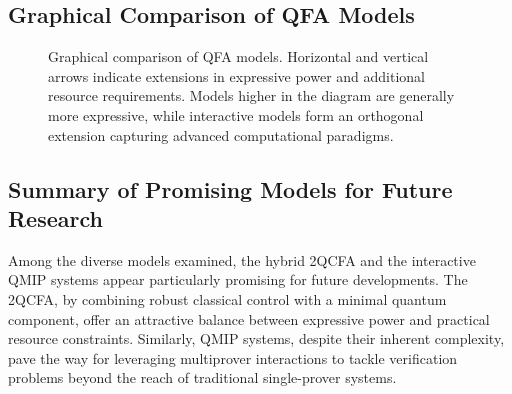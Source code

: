 \subsection*{Graphical Comparison of QFA Models}
\begin{figure}[ht]
\centering
{}
\caption{Graphical comparison of QFA models. Horizontal and vertical arrows indicate extensions in expressive power and additional resource requirements. Models higher in the diagram are generally more expressive, while interactive models form an orthogonal extension capturing advanced computational paradigms.}
\label{fig:qfa-graphical}
\end{figure}

\subsection*{Summary of Promising Models for Future Research}
Among the diverse models examined, the hybrid 2QCFA and the interactive QMIP systems appear particularly promising for future developments. The 2QCFA, by combining robust classical control with a minimal quantum component, offer an attractive balance between expressive power and practical resource constraints. Similarly, QMIP systems, despite their inherent complexity, pave the way for leveraging multiprover interactions to tackle verification problems beyond the reach of traditional single-prover systems.

